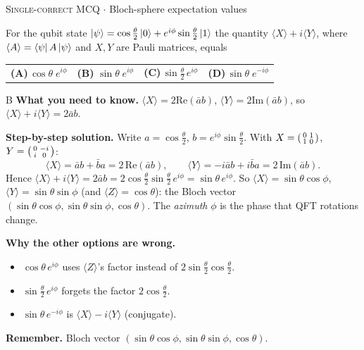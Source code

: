 \documentclass[11pt,a4paper]{article}
\newcommand{\optlabel}[1]{\textbf{(#1)}}
\newcommand{\correctlabel}[1]{\textcolor{okgreen}{\textbf{(#1)}\,\ding{51}}}
\newenvironment{qitem}[1]{\begin{list}{}{\setlength{\leftmargin}{3.3em}\setlength{\labelwidth}{3.1em}%
  \setlength{\labelsep}{0.2em}\setlength{\topsep}{3pt}\setlength{\parsep}{3pt}}\item[\textbf{Q.#1}\hfill]}{\end{list}}
\newcommand{\qsep}{\par\vspace{2pt}{\color{black!15}\hrule}\vspace{4pt}}
\newcommand{\qmeta}[2]{{\footnotesize\color{black!60}\textsc{#1} \;$\cdot$\; #2}\par}
\begin{document}
\begin{qitem}{24}
\qmeta{Single-correct MCQ}{Bloch-sphere expectation values}
For the qubit state $\ket{\psi} = \cos\frac{\theta}{2}\ket{0} + e^{i\phi}\sin\frac{\theta}{2}\ket{1}$ the quantity
$\langle X\rangle + i\langle Y\rangle$, where $\langle A\rangle = \bra{\psi}A\ket{\psi}$ and $X, Y$ are Pauli matrices, equals
\par\smallskip\noindent\begin{tabularx}{\linewidth}{@{}*{4}{L}@{}}
\optlabel{A}\,$\cos\theta\; e^{i\phi}$ & \correctlabel{B}\,$\sin\theta\; e^{i\phi}$ & \optlabel{C}\,$\sin\frac{\theta}{2}\, e^{i\phi}$ & \optlabel{D}\,$\sin\theta\; e^{-i\phi}$
\end{tabularx}
\end{qitem}
\begin{solbox}{B}
\textbf{\color{brand}What you need to know.} $\langle X\rangle = 2\mathrm{Re}(\bar a b)$, $\langle Y\rangle = 2\mathrm{Im}(\bar a b)$, so $\langle X\rangle + i\langle Y\rangle = 2\bar a b$.

\textbf{\color{brand}Step-by-step solution.} Write $a = \cos\frac\theta2$, $b = e^{i\phi}\sin\frac\theta2$. With $X = \begin{psmallmatrix}0&1\\1&0\end{psmallmatrix}$,
$Y = \begin{psmallmatrix}0&-i\\i&0\end{psmallmatrix}$:
\[ \langle X\rangle = \bar a b + \bar b a = 2\,\mathrm{Re}(\bar a b), \qquad \langle Y\rangle = -i\bar a b + i\bar b a = 2\,\mathrm{Im}(\bar a b). \]
Hence $\langle X\rangle + i\langle Y\rangle = 2\bar a b = 2\cos\frac\theta2\sin\frac\theta2\,e^{i\phi} = \sin\theta\,e^{i\phi}$.
So $\langle X\rangle = \sin\theta\cos\phi$, $\langle Y\rangle = \sin\theta\sin\phi$ (and $\langle Z\rangle = \cos\theta$): the Bloch vector
$(\sin\theta\cos\phi, \sin\theta\sin\phi, \cos\theta)$. The \emph{azimuth} $\phi$ is the phase that QFT rotations change.

\textbf{\color{brand}Why the other options are wrong.}
\begin{itemize}[leftmargin=2.4em, itemsep=1pt, topsep=2pt]
\item[\textbf{(A)}] $\cos\theta\,e^{i\phi}$ uses $\langle Z\rangle$'s factor instead of $2\sin\frac\theta2\cos\frac\theta2$.
\item[\textbf{(C)}] $\sin\frac\theta2\,e^{i\phi}$ forgets the factor $2\cos\frac\theta2$.
\item[\textbf{(D)}] $\sin\theta\,e^{-i\phi}$ is $\langle X\rangle - i\langle Y\rangle$ (conjugate).
\end{itemize}
\textbf{\color{brand}Remember.} Bloch vector $(\sin\theta\cos\phi, \sin\theta\sin\phi, \cos\theta)$.
\end{solbox}
\qsep
\end{document}
